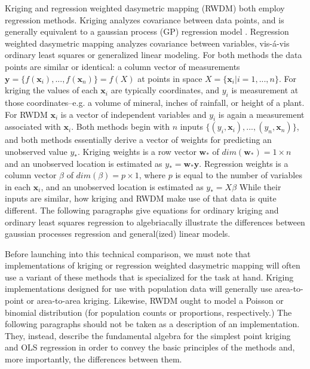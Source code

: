 \documentclass[draft]{article}
\begin{document}
Kriging and regression weighted dasymetric mapping (RWDM) both employ regression methods.  Kriging analyzes covariance between data points, and is generally equivalent to a gaussian process (GP) regression model \cite{rasmussen06}.  Regression weighted dasymetric mapping analyzes covariance between variables, vis-\'{a}-vis ordinary least squares or generalized linear modeling.  For both methods the data points are similar or identical: a column vector of measurements $\bm{y}=\{f(\bm{x}_i), ..., f(\bm{x}_n)\}=f(X)$ at points in space $X=\{\bm{x}_i | i=1, ..., n\}$.  For kriging the values of each $\bm{x}_i$ are typically coordinates, and $y_i$ is measurement at those coordinates--e.g. a volume of mineral, inches of rainfall, or height of a plant.  For RWDM $\bm{x}_i$ is a vector of independent variables and $y_i$ is again a measurement associated with $\bm{x}_i$.  Both methods begin with $n$ inputs $\{(y_i, \bm{x}_i), ..., (y_n, \bm{x}_n)\}$, and both methods essentially derive a vector of weights for predicting an unobserved value $y_*$.  Kriging weights is a row vector $\bm{w}_*$ of $dim(\bm{w}_*)=1 \times n$ and an unobserved location is estimated as $y_*=\bm{w}_*\bm{y}$.  Regression weights is a column vector $\beta$ of $dim(\beta)=p \times 1$, where $p$ is equal to the number of variables in each $\bm{x}_i$, and an unobserved location is estimated as $y_*=X\beta$ %
While their inputs are similar, how kriging and RWDM make use of that data is quite different.  The following paragraphs give equations for ordinary kriging and ordinary least squares regression to algebriacally illustrate the differences between gaussian processes regression and general(ized) linear models.

Before launching into this technical comparison, we must note that implementations of kriging or regression weighted dasymetric mapping will often use a variant of these methods that is specialized for the task at hand.  Kriging implementations designed for use with population data will generally use area-to-point or area-to-area kriging.  Likewise, RWDM ought to model a Poisson or binomial distribution (for population counts or proportions, respectively.)  The following paragraphs should not be taken as a description of an implementation.  They, instead, describe the fundamental algebra for the simplest point kriging and OLS regression in order to convey the basic principles of the methods and, more importantly, the differences between them.
\end{document}
